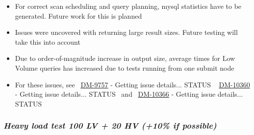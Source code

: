 \begin{itemize}
\begin{itemize}
    \begin{itemize}
    \item
      For correct scan scheduling and query planning, mysql statistics
      have to be generated. Future work for this is planned
    \item
      Issues were uncovered with returning large result sizes. Future
      testing will take this into account
    \item
      Due to order-of-magnitude increase in output size, average times
      for Low Volume queries has increased due to tests running from one
      submit node
    \item
      For these issues, see~
      \href{https://jira.lsstcorp.org/browse/DM-9757}{DM-9757} - Getting
      issue details... STATUS ~
      \href{https://jira.lsstcorp.org/browse/DM-10360}{DM-10360} -
      Getting issue details... STATUS ~and~
      \href{https://jira.lsstcorp.org/browse/DM-10366}{DM-10366} -
      Getting issue details... STATUS
    \end{itemize}
  \end{itemize}
\end{itemize}

\subsubsection{\texorpdfstring{\textbf{\emph{Heavy load test 100 LV + 20
HV (+10\% if
possible)}}}{Heavy load test 100 LV + 20 HV (+10\% if possible)}}\label{heavy-load-test-100-lv-20-hv-10-if-possible}

